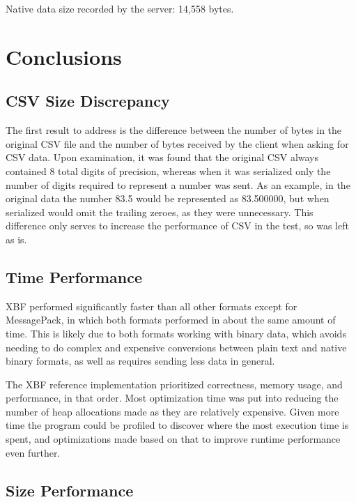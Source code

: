 \documentclass[conference]{IEEEtran}
\begin{document}
Native data size recorded by the server: 14,558 bytes.

\section{Conclusions}

\subsection{CSV Size Discrepancy}

The first result to address is the difference between the number of bytes in the original CSV file and the number of bytes received by the client when asking for CSV data. Upon examination, it was found that the original CSV always contained 8 total digits of precision, whereas when it was serialized only the number of digits required to represent a number was sent. As an example, in the original data the number 83.5 would be represented as 83.500000, but when serialized would omit the trailing zeroes, as they were unnecessary. This difference only serves to increase the performance of CSV in the test, so was left as is.

\subsection{Time Performance}

XBF performed significantly faster than all other formats except for MessagePack, in which both formats performed in about the same amount of time. This is likely due to both formats working with binary data, which avoids needing to do complex and expensive conversions between plain text and native binary formats, as well as requires sending less data in general.

The XBF reference implementation prioritized correctness, memory usage, and performance, in that order. Most optimization time was put into reducing the number of heap allocations made as they are relatively expensive. Given more time the program could be profiled to discover where the most execution time is spent, and optimizations made based on that to improve runtime performance even further.

\subsection{Size Performance}
\end{document}
